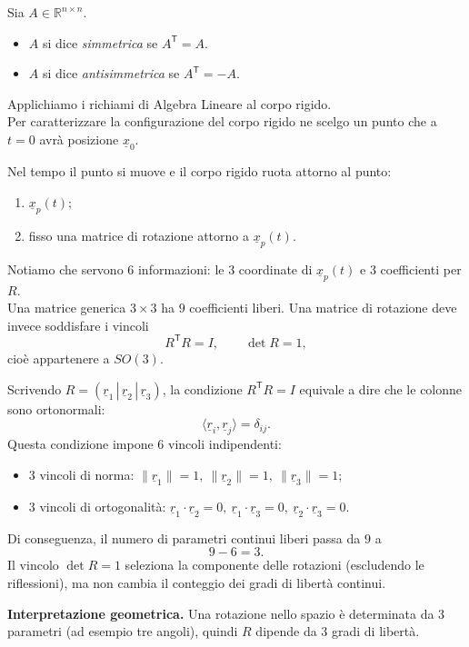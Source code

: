 \begin{definition}{}
Sia $A\in\mathbb{R}^{n\times n}$.
\begin{itemize}
\item $A$ si dice \emph{simmetrica} se $A^{\mathsf T}=A$.
\item $A$ si dice \emph{antisimmetrica} se $A^{\mathsf T}=-A$.
\end{itemize}
\end{definition}

Applichiamo i richiami di Algebra Lineare al corpo rigido.\\

Per caratterizzare la configurazione del corpo rigido ne scelgo un punto che a $t=0$ avrà posizione $\underline{x}_0$.

Nel tempo il punto si muove e il corpo rigido ruota attorno al punto:
\begin{enumerate}[label=\roman*)]
\item $\underline{x}_p(t)$;
\item fisso una matrice di rotazione attorno a $\underline{x}_p(t)$.
\end{enumerate}
Notiamo che servono 6 informazioni: le 3 coordinate di $\underline{x}_p(t)$ e 3 coefficienti per $R$.
\\Una matrice generica $3\times 3$ ha $9$ coefficienti liberi. Una matrice di rotazione deve invece soddisfare i vincoli
\[
R^{\mathsf T}R=I,\qquad \det R=1,
\]
cioè appartenere a $SO(3)$.

Scrivendo $R=(\underline r_1\,|\,\underline r_2\,|\,\underline r_3)$, la condizione $R^{\mathsf T}R=I$ equivale a dire che le colonne sono ortonormali:
\[
\langle \underline r_i,\underline r_j\rangle=\delta_{ij}.
\]
Questa condizione impone $6$ vincoli indipendenti:
\begin{itemize}
\item $3$ vincoli di norma: $\|\underline r_1\|=1,\ \|\underline r_2\|=1,\ \|\underline r_3\|=1$;
\item $3$ vincoli di ortogonalità: $\underline r_1\cdot \underline r_2=0,\ \underline r_1\cdot \underline r_3=0,\ \underline r_2\cdot \underline r_3=0$.
\end{itemize}
Di conseguenza, il numero di parametri continui liberi passa da $9$ a
\[
9-6=3.
\]
Il vincolo $\det R=1$ seleziona la componente delle rotazioni (escludendo le riflessioni), ma non cambia il conteggio dei gradi di libertà continui.

\medskip
\textbf{Interpretazione geometrica.}
Una rotazione nello spazio è determinata da $3$ parametri (ad esempio tre angoli), quindi $R$ dipende da $3$ gradi di libertà.\\

